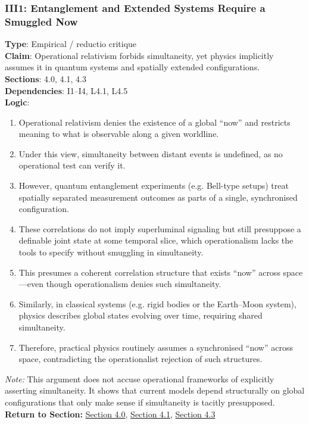 \documentclass[12pt]{book}
\begin{document}
\subsubsection*{III1: Entanglement and Extended Systems Require a Smuggled Now}
\label{appendix:III1}
\textbf{Type}: Empirical / reductio critique\\
\textbf{Claim}: Operational relativism forbids simultaneity, yet physics implicitly assumes it in quantum systems and spatially extended configurations.\\
\textbf{Sections}: 4.0, 4.1, 4.3\\
\textbf{Dependencies}: I1–I4, L4.1, L4.5\\
\textbf{Logic}:
\begin{enumerate}
    \item Operational relativism denies the existence of a global ``now'' and restricts meaning to what is observable along a given worldline.
    \item Under this view, simultaneity between distant events is undefined, as no operational test can verify it.
    \item However, quantum entanglement experiments (e.g. Bell-type setups) treat spatially separated measurement outcomes as parts of a single, synchronised configuration.
    \item These correlations do not imply superluminal signaling but still presuppose a definable joint state at some temporal slice, which operationalism lacks the tools to specify without smuggling in simultaneity.
    \item This presumes a coherent correlation structure that exists ``now'' across space---even though operationalism denies such simultaneity.
    \item Similarly, in classical systems (e.g. rigid bodies or the Earth–Moon system), physics describes global states evolving over time, requiring shared simultaneity.
    \item Therefore, practical physics routinely assumes a synchronised ``now'' across space, contradicting the operationalist rejection of such structures.
\end{enumerate}
\textit{Note:} This argument does not accuse operational frameworks of explicitly asserting simultaneity. It shows that current models depend structurally on global configurations that only make sense if simultaneity is tacitly presupposed.\\
\textbf{Return to Section:} \hyperref[sec:4]{Section 4.0}, \hyperref[sec:4.1]{Section 4.1}, \hyperref[sec:4.3]{Section 4.3}
\end{document}
